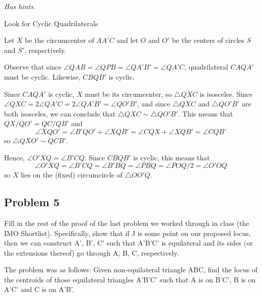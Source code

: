 \textit{Has hints.}
\begin{sketch}
    Look for Cyclic Quadrilaterals    
\end{sketch}

\begin{mdsoln}

Let $X$ be the circumcenter of $AA'C$ and let $O$ and $O'$ be the centers of circles $S$ and $S'$, respectively.

Observe that since $\angle QAB=\angle QPB=\angle QA'B'=\angle QA'C$, quadrilateral $CAQA'$ must be cyclic. Likewise, $CBQB'$ is cyclic.

Since $CAQA'$ is cyclic, $X$ must be its circumcenter, so $\triangle QXC$ is isosceles. Since $\angle QXC=2\angle QA'C=2\angle QA'B'=\angle QO'B'$, and since $\triangle QXC$ and $\triangle QO'B'$ are both isosceles, we can conclude that $\triangle QXC\sim \triangle QO'B'$. This means that $QX/QO'=QC/QB'$ and$$\angle XQO'=\angle B'QO'+\angle XQB'=\angle CQX+\angle XQB'=\angle CQB'$$so $\triangle QXO'\sim QCB'$.

Hence, $\angle O'XQ=\angle B'CQ$. Since $CBQB'$ is cyclic, this means that$$\angle O'XQ=\angle B'CQ=\angle B'BQ=\angle PBQ=\angle POQ/2=\angle O'OQ$$so $X$ lies on the (fixed) circumcircle of $\triangle OO'Q$.


\end{mdsoln}


\subsection{Problem 5}

Fill in the rest of the proof of the last problem we worked through in class (the IMO Shortlist). Specifically, show that if J is some point on our proposed locus, then we can construct A', B', C' such that A'B'C' is equilateral and its sides (or the extensions thereof) go through A, B, C, respectively.

The problem was as follows:
Given non-equilateral triangle ABC, find the locus of the centroids of those equilateral triangles A'B'C' such that A is on B'C', B is on A'C' and C is on A'B'.

